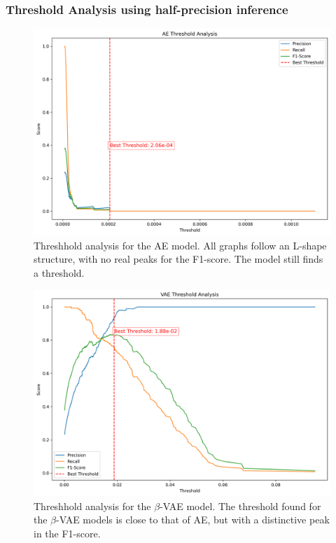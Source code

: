 \subsubsection{Threshold Analysis using half-precision inference}

\begin{figure}[!h]
  \centering
  \includegraphics[scale=0.4]{figures/anomalies/ae/threshold_True.png}
  \caption{Threshhold analysis for the AE model. All graphs follow an L-shape structure, with no real peaks for the F1-score. The model still finds a threshold.}
  \label{fig:threshold_ae}
\end{figure}

\begin{figure}[!h]
  \centering
  \includegraphics[scale=0.4]{figures/anomalies/vae/threshold_True.png}
  \caption{Threshhold analysis for the $\beta$-VAE model. The threshold found for the $\beta$-VAE models is close to that of AE, but with a distinctive peak in the F1-score.}
  \label{fig:threshold_vae}
\end{figure}

